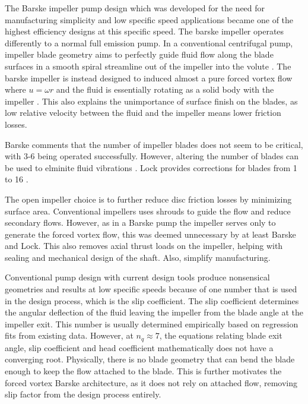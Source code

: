The Barske impeller pump design which was developed for the need for manufacturing simplicity and low specific speed applications became one of the highest efficiency designs at this specific speed.  The barske impeller operates differently to a normal full emission pump. In a conventional centrifugal pump, impeller blade geometry aims to perfectly guide fluid flow along the blade surfaces in a smooth spiral streamline out of the impeller into the volute \cite{something}. The barske impeller is instead designed to induced almost a pure forced vortex flow where $u=\omega r$ and the fluid is essentially rotating as a solid body with the impeller \cite{barskeunconventionalpaper}. This also explains the unimportance of surface finish on the blades, as low relative velocity between the fluid and the impeller means lower friction losses. 


Barske comments that the number of impeller blades does not seem to be critical, with 3-6 being operated successfully. However, altering the number of blades can be used to elminite fluid vibrations \cite{barske1953}. Lock provides corrections for blades from 1 to 16 \cite{lockfig10A}.

The open impeller choice is to further reduce disc friction losses  by minimizing surface area. Conventional impellers uses shrouds to guide the flow and reduce secondary flows. However, as in a Barske pump the impeller serves only to generate the forced vortex flow, this was deemed unnecessary by at least Barske and Lock. This also removes axial thrust loads on the impeller, helping with sealing and mechanical design of the shaft. Also, simplify manufacturing.

Conventional pump design with current design tools produce nonsensical geometries and results at low specific speeds because of one number that is used in the design process, which is the slip coefficient. The slip coefficient determines the angular deflection of the fluid leaving the impeller from the blade angle at the impeller exit. This number is usually determined empirically based on regression fits from existing data. However, at $n_q\approx 7$, the equations relating blade exit angle, slip coefficient and head coefficient mathematically does not have a converging root. Physically, there is no blade geometry that can bend the blade enough to keep the flow attached to the blade. This is further motivates the forced vortex Barske architecture, as it does not rely on attached flow, removing slip factor from the design process entirely.

